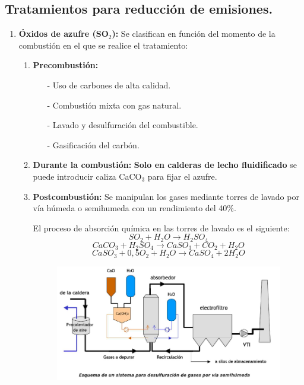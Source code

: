 \subsection{Tratamientos para reducción de emisiones.}
\begin{enumerate}
	\item \textbf{Óxidos de azufre (SO$_2$):}
	Se clasifican en función del momento de la combustión en el que se realice el tratamiento:
	\begin{enumerate}
		\item \textbf{Precombustión:} 
		\begin{itemize}
			\item [-] Uso de carbones de alta calidad.
			\item [-] Combustión mixta con gas natural.
			\item [-] Lavado y desulfuración del combustible.
			\item [-] Gasificación del carbón.
		\end{itemize}
		\item \textbf{Durante la combustión:}
		\textbf{Solo en calderas de lecho fluidificado} se puede introducir caliza CaCO$_3$ para fijar el azufre. 
		\item \textbf{Postcombustión:}
			Se manipulan los gases mediante torres de lavado por vía húmeda o semihumeda con un rendimiento del 40\%.
			
			El proceso de absorción química en las torres de lavado es el siguiente:
			\[SO_2+H_2O\rightarrow H_2SO_4\]
			\[CaCO_3+H_2SO_4\rightarrow CaSO_3+CO_2+H_2O\]
			\[CaSO_3+0,5O_2+H_2O\rightarrow CaSO_4+2H_2O\]
			\begin{figure}[H]
				\centering
				\includegraphics[width=0.5\linewidth]{res/tema2/desulfuric}
				\label{fig:desulfuric}
			\end{figure}
			

\end{enumerate}
\end{enumerate}
